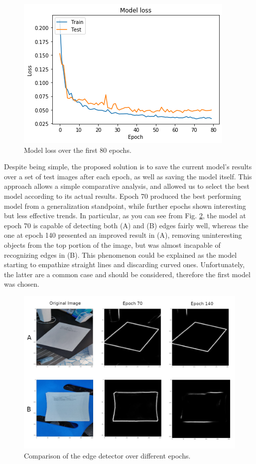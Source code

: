 \documentclass[a4paper]{article}
\begin{document}
\begin{figure}[htb!]
	\centering
	\includegraphics[width=0.7\linewidth]{model_loss.png}
	\caption{Model loss over the first 80 epochs.}
	\label{fig:model_loss}
\end{figure}

Despite being simple, the proposed solution is to save the current model's results over a set of test images after each epoch, as well as saving the model itself. This approach allows a simple comparative analysis, and allowed us to select the best model according to its actual results. Epoch 70 produced the best performing model from a generalization standpoint, while further epochs shown interesting but less effective trends. In particular, as you can see from Fig. \ref{fig:edge_comparison_epoch}, the model at epoch 70 is capable of detecting both (A) and (B) edges fairly well, whereas the one at epoch 140 presented an improved result in (A), removing uninteresting objects from the top portion of the image, but was almost incapable of recognizing edges in (B). This phenomenon could be explained as the model starting to empathize straight lines and discarding curved ones. Unfortunately, the latter are a common case and should be considered, therefore the first model was chosen.

\begin{figure}[htb!]
	\centering
	\includegraphics[width=\linewidth]{edge_comparison_epoch.png}
	\caption{Comparison of the edge detector over different epochs.}
	\label{fig:edge_comparison_epoch}
\end{figure}
\end{document}
